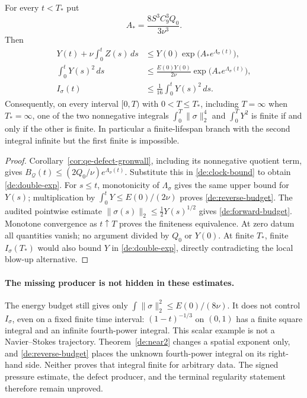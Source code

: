 \begin{corollary}
\label{de:no-separation}
For every $t<T_*$ put
\[
 A_* =\frac{8S^3C_9^3Q_0}{3\nu^3}.
\]
Then
\begin{align}
 Y(t)+\nu\int_0^t Z(s)\,ds
 &\le Y(0)\exp\bigl(A_*e^{\Lambda_\sigma(t)}\bigr),\label{de:double-exp}\\
 \int_0^tY(s)^2\,ds
 &\le\frac{E(0)Y(0)}{2\nu}
          \exp\bigl(A_*e^{\Lambda_\sigma(t)}\bigr),\label{de:reverse-budget}\\
 I_\sigma(t)&\le\frac1{16}\int_0^tY(s)^2\,ds.\label{de:forward-budget}
\end{align}
Consequently, on every interval $[0,T)$ with $0<T\le T_*$, including
$T=\infty$ when $T_*=\infty$, one of the two nonnegative integrals
$\int_0^T\|\sigma\|_2^4$ and $\int_0^TY^2$ is finite if and only if
the other is finite.  In particular a finite-lifespan branch with the
second integral infinite but the first finite is impossible.
\end{corollary}
\begin{proof}
Corollary~\ref{cor:qe-defect-gronwall}, including its nonnegative
quotient term, gives
$B_{\mathcal Q}(t)\le(2Q_0/\nu)e^{\Lambda_\sigma(t)}$.
Substitute this in \eqref{de:clock-bound} to obtain
\eqref{de:double-exp}.  For $s\le t$, monotonicity of
$\Lambda_\sigma$ gives the same upper bound for $Y(s)$; multiplication
by $\int_0^tY\le E(0)/(2\nu)$ proves \eqref{de:reverse-budget}.
The audited pointwise estimate $\|\sigma(s)\|_2\le\frac12Y(s)^{1/2}$
gives \eqref{de:forward-budget}.  Monotone convergence as $t\uparrow T$
proves the finiteness equivalence.  At zero datum all quantities vanish;
no argument divided by $Q_0$ or $Y(0)$.  At finite $T_*$, finite
$I_\sigma(T_*)$ would also bound $Y$ in \eqref{de:double-exp}, directly
contradicting the local blow-up alternative.
\end{proof}

\paragraph{The missing producer is not hidden in these estimates.}
The energy budget still gives only $\int\|\sigma\|_2^2\le E(0)/(8\nu)$.
It does not control $I_\sigma$, even on a fixed finite time interval:
$(1-t)^{-1/3}$ on $(0,1)$ has a finite square integral and an infinite
fourth-power integral.  This scalar example is not a Navier--Stokes
trajectory.  Theorem~\ref{de:near2} changes a spatial exponent only, and
\eqref{de:reverse-budget} places the unknown fourth-power integral on
its right-hand side.  Neither proves that integral finite for arbitrary
data.  The signed pressure estimate, the defect producer, and the terminal
regularity statement therefore remain unproved.
